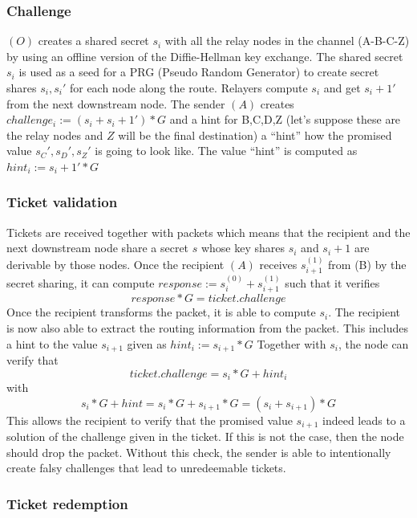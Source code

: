 \subsubsection*{Challenge}
$(O)$ creates a shared secret $s_i$ with all the relay nodes in the channel (A-B-C-Z) by using an offline version of the Diffie-Hellman key exchange.
\newline The shared secret $s_i$ is used as a seed for a PRG (Pseudo Random Generator) to create secret shares $s_i,s_i'$ for each node along the route. 
Relayers compute $s_i$ and get $s_i+1'$ from the next downstream node. 
\newline The sender $(A)$ creates $challenge_i:=(s_i+s_i+1')*G$ and a hint for B,C,D,Z (let’s suppose these are the relay nodes and $Z$ will be the final destination) a “hint” how the promised value $s_C',s_D',s_Z'$ is going to look like. 
The value “hint” is computed as $hint_i:=s_i+1'*G$ 


\subsubsection{Ticket validation}
Tickets are received together with packets which means that the recipient and the next downstream node share a secret $s$ whose key shares $s_i$ and $s_i+1$ are derivable by those nodes.
\newline Once the recipient $(A)$ receives $s_{i+1}^{(1)}$ from (B) by the secret sharing, it can compute $response:=s_i^{(0)}+s_{i+1}^{(1)}$ such that it verifies  
$$response*G=ticket.challenge$$
Once the recipient transforms the packet, it is able to compute $s_i$. The recipient is now also able to extract the routing information from the packet. 
This includes a hint to the value $s_{i+1}$ given as $hint_i:=s_{i+1}*G$ 
\newline Together with $s_i$, the node can verify that $$ticket.challenge=s_i*G+hint_i$$ with $$s_i*G+hint=s_i*G+s_{i+1}*G=(s_i+s_{i+1})*G$$ 
This allows the recipient to verify that the promised value $s_{i+1}$ indeed leads to a solution of the challenge given in the ticket. 
If this is not the case, then the node should drop the packet.
\newline Without this check, the sender is able to intentionally create falsy challenges that lead to unredeemable tickets.


\subsubsection{Ticket redemption}


